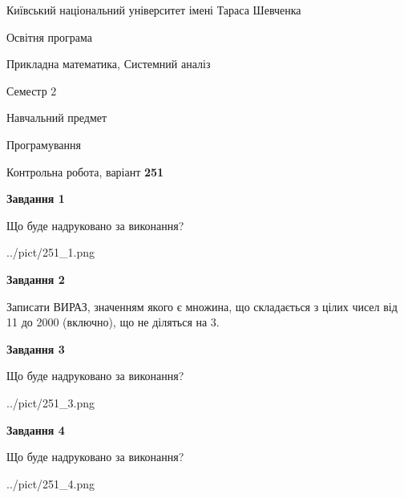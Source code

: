 \documentclass[12pt, ukrainian]{article}
\begin{document}
{{\begin {small}\par
{ \center  Київський національний університет імені Тараса Шевченка \par}
{\parbox {5 cm}{Освітня програма \hfill}{\parbox {8 cm}{Прикладна математика, Системний аналіз \hfill}}\parbox {5 cm}{\hfill Семестр 2}}\par
{\parbox {5 cm} {Навчальний предмет \hfill}\parbox {7 cm}{Програмування \hfill}\parbox {6cm}{\hfill}\par}\vspace{-7pt} \end{small}}{\center Контрольна робота, варіант  \No \textbf
{ 251 }\par}}
{
\begin {large}
{\begin {center}\textbf{Завдання 1}\end {center}}\par
Що буде надруковано за виконання?\par\par
\begin{center}
	{../pict/251_1.png}
\end{center}
\newpage

{\begin {center}\textbf{Завдання 2}\end {center}}\par
Записати ВИРАЗ, значенням якого є множина, що складається з цілих чисел від 11 до 2000 (включно), що не діляться на 3.\par
\newpage

{\begin {center}\textbf{Завдання 3}\end {center}}\par
Що буде надруковано за виконання?\par
\begin{center}
	{../pict/251_3.png}
\end{center}
\newpage

{\begin {center}\textbf{Завдання 4}\end {center}}\par
Що буде надруковано за виконання?\par
\begin{center}
	{../pict/251_4.png}
\end{center}
\newpage


\end{large}}
\end{document}
